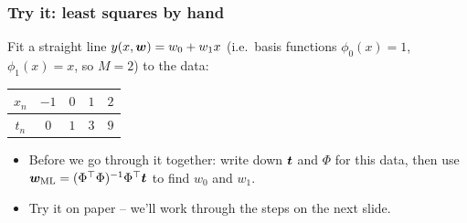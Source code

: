 \documentclass[10pt]{beamer}
\begin{document}
\begin{frame}[fragile]
\frametitle{Try it: least squares by hand}

\begin{example}
Fit a straight line $y(x,\boldsymbol{w}) = w_0 + w_1 x$ (i.e.\ basis functions
$\phi_0(x){=}1$, $\phi_1(x){=}x$, so $M{=}2$) to the data:
\begin{center}
\begin{tabular}{c|c|c|c|c}
$x_n$ & $-1$ & $0$ & $1$ & $2$\\ \hline
$t_n$ & $0$ & $1$ & $3$ & $9$
\end{tabular}
\end{center}
\end{example}

\vspace{6pt}
\begin{itemize}
\item Before we go through it together: write down $\boldsymbol{t}$ and $\Phi$
  for this data, then use
  $\boldsymbol{w}_{\mathrm{ML}} = (\Phi^\top \Phi)^{-1} \Phi^\top \boldsymbol{t}$ to find
  $w_0$ and $w_1$.
\item[$\Rightarrow$] Try it on paper -- we'll work through the steps on
  the next slide.
\end{itemize}

\end{frame}
\end{document}
